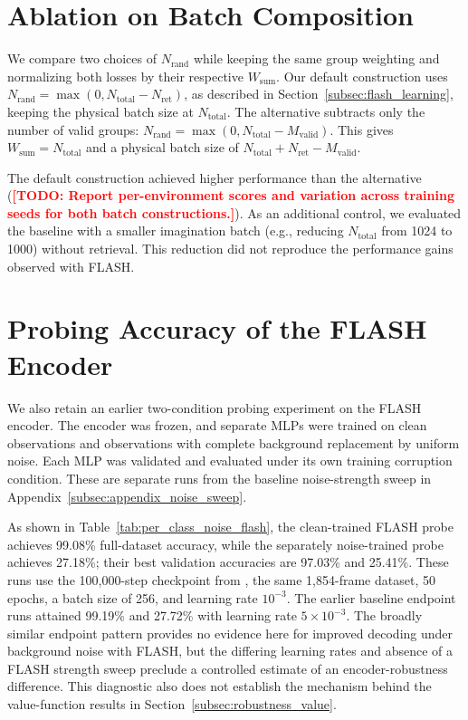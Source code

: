 \documentclass{article} %
\newcommand{\todo}[1]{\textcolor{red}{\textbf{[TODO: #1]}}}
\begin{document}
\section{Ablation on Batch Composition}
\label{sec:appendix_ablation_weight}
We compare two choices of $N_{\text{rand}}$ while keeping the same group weighting and normalizing both losses by their respective $W_{\text{sum}}$. Our default construction uses $N_{\text{rand}} = \max(0, N_{\text{total}} - N_{\text{ret}})$, as described in Section~\ref{subsec:flash_learning}, keeping the physical batch size at $N_{\text{total}}$. The alternative subtracts only the number of valid groups: $N_{\text{rand}} = \max(0, N_{\text{total}} - M_{\text{valid}})$. This gives $W_{\text{sum}} = N_{\text{total}}$ and a physical batch size of $N_{\text{total}} + N_{\text{ret}} - M_{\text{valid}}$.

The default construction achieved higher performance than the alternative (\todo{Report per-environment scores and variation across training seeds for both batch constructions.}). As an additional control, we evaluated the baseline with a smaller imagination batch (e.g., reducing $N_{\text{total}}$ from 1024 to 1000) without retrieval. This reduction did not reproduce the performance gains observed with FLASH.



\section{Probing Accuracy of the FLASH Encoder}
\label{sec:appendix_noise_robustness_flash}
We also retain an earlier two-condition probing experiment on the FLASH encoder. The encoder was frozen, and separate MLPs were trained on clean observations and observations with complete background replacement by uniform noise. Each MLP was validated and evaluated under its own training corruption condition. These are separate runs from the baseline noise-strength sweep in Appendix~\ref{subsec:appendix_noise_sweep}.

As shown in Table~\ref{tab:per_class_noise_flash}, the clean-trained FLASH probe achieves 99.08\% full-dataset accuracy, while the separately noise-trained probe achieves 27.18\%; their best validation accuracies are 97.03\% and 25.41\%. These runs use the 100,000-step checkpoint from \texttt{}, the same 1,854-frame dataset, 50 epochs, a batch size of 256, and learning rate $10^{-3}$. The earlier baseline endpoint runs attained 99.19\% and 27.72\% with learning rate $5\times10^{-3}$. The broadly similar endpoint pattern provides no evidence here for improved decoding under background noise with FLASH, but the differing learning rates and absence of a FLASH strength sweep preclude a controlled estimate of an encoder-robustness difference. This diagnostic also does not establish the mechanism behind the value-function results in Section~\ref{subsec:robustness_value}.
\end{document}
